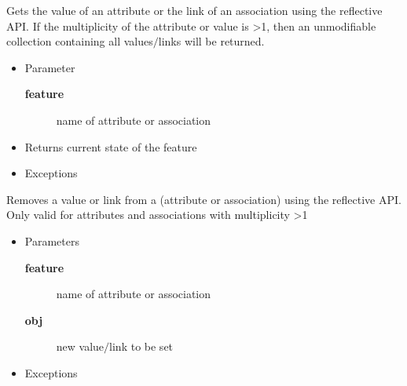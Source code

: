 \begin{desc}Gets the value of an attribute or the link of an association using the
 reflective API. If the multiplicity of the attribute or value is \textgreater  1,
 then an unmodifiable collection containing all values$/$links will be
 returned.
\begin{itemize}
\item{Parameter
  \begin{description}
   \item[{\bf feature}]{name of attribute or association}
  \end{description}}
\end{itemize}
\begin{itemize}
\item{Returns current state of the feature }
\item{{Exceptions}
}
\end{itemize}
\end{desc}

\begin{desc}Removes a value or link from a (attribute or association) using the
 reflective API. Only valid for attributes and associations with
 multiplicity \textgreater  1
\begin{itemize}
\item{Parameters
  \begin{description}
   \item[{\bf feature}]{name of attribute or association}
   \item[{\bf obj}]{new value$/$link to be set}
  \end{description}}
\end{itemize}
\begin{itemize}
\item{{Exceptions}
}
\end{itemize}
\end{desc}

